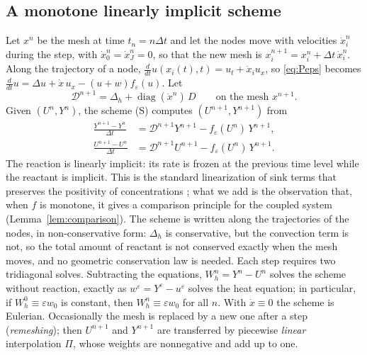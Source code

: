\documentclass[11pt]{amsart}
\theoremstyle{definition}
\theoremstyle{remark}
\newcommand{\ve}{\varepsilon}
\begin{document}
\subsection{A monotone linearly implicit scheme}\label{sec:theory}

Let $x^n$ be the mesh at time $t_n=n\Delta t$ and let the nodes move with velocities
$\dot x^n_i$ during the step, with $\dot x^n_0=\dot x^n_J=0$, so that the new mesh is
$x^{n+1}_i=x^n_i+\Delta t\,\dot x^n_i$. Along the trajectory of a node,
$\frac{d}{dt}u(x_i(t),t)=u_t+\dot x_iu_x$, so \eqref{eq:Peps} becomes
$\frac{d}{dt}u=\Delta u+\dot x\,u_x-(u+w)f_\ve(u)$. Let
\[
\mathcal D^{n+1}=\Delta_h+\operatorname{diag}(\dot x^n)\,D\qquad\text{on the mesh }x^{n+1}.
\]
Given $(U^n,Y^n)$, the scheme (S) computes $(U^{n+1},Y^{n+1})$ from
\begin{align}
\frac{Y^{n+1}-Y^n}{\Delta t}&=\mathcal D^{n+1}Y^{n+1}-f_\ve(U^n)\,Y^{n+1},\label{eq:SY}\\
\frac{U^{n+1}-U^n}{\Delta t}&=\mathcal D^{n+1}U^{n+1}-f_\ve(U^n)\,Y^{n+1}.\label{eq:SU}
\end{align}
The reaction is linearly implicit: its rate is frozen at the previous time level
while the reactant is implicit. This is the standard linearization of sink terms that
preserves the positivity of concentrations
\cite{Patankar1980}; what we add is the observation that, when $f$ is
monotone, it gives a comparison principle for the coupled system
(Lemma~\ref{lem:comparison}). The scheme is written along the trajectories of the nodes,
in non-conservative form: $\Delta_h$ is conservative, but the convection term is not, so
the total amount of reactant is not conserved exactly when the mesh moves, and no
geometric conservation law is needed. Each step requires two tridiagonal solves. Subtracting
the equations, $W_h^n=Y^n-U^n$ solves the scheme without reaction, exactly as
$w^\ve=Y^\ve-u^\ve$ solves the heat equation; in particular, if $W_h^0\equiv\ve w_0$ is
constant, then $W_h^n\equiv\ve w_0$ for all $n$. With $\dot x\equiv0$ the scheme is
Eulerian. Occasionally the mesh is replaced by a new one after a step
(\emph{remeshing}); then $U^{n+1}$ and $Y^{n+1}$ are transferred by piecewise
\emph{linear} interpolation $\Pi$, whose weights are nonnegative and add up to one.
\end{document}
